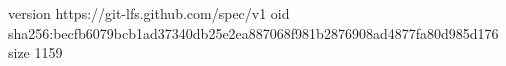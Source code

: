 version https://git-lfs.github.com/spec/v1
oid sha256:becfb6079bcb1ad37340db25e2ea887068f981b2876908ad4877fa80d985d176
size 1159
